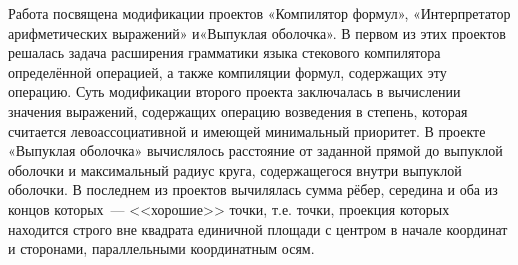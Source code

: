 Работа посвящена модификации проектов «Компилятор формул»,
«Интерпретатор арифметических выражений» и«Выпуклая оболочка». В первом из этих проектов решалась задача расширения грамматики языка стекового компилятора определённой операцией, а также компиляции формул, содержащих эту операцию. Суть модификации второго проекта заключалась в вычислении значения выражений, содержащих операцию возведения в степень, которая считается левоассоциативной и имеющей минимальный приоритет. В проекте «Выпуклая оболочка» вычислялось расстояние от заданной прямой до выпуклой оболочки и максимальный радиус круга, содержащегося внутри выпуклой оболочки. В последнем из проектов вычилялась сумма рёбер, середина и оба из концов которых~--- <<хорошие>> точки, т.е. точки, проекция которых находится строго вне квадрата единичной площади с центром в начале координат и сторонами,  параллельными координатным осям.
